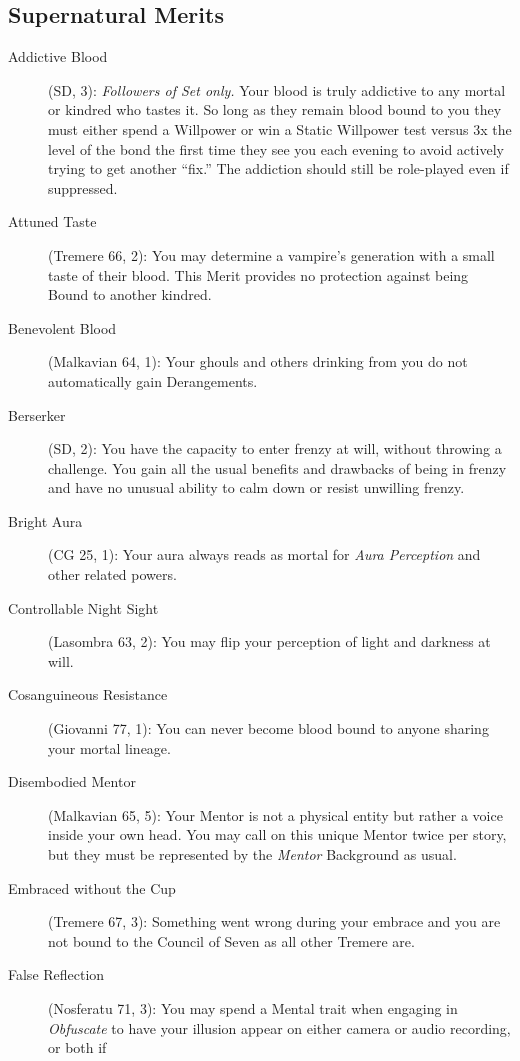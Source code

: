 \subsection{Supernatural Merits}
\begin{description}
	\item[Addictive Blood] (SD, 3):  \emph{Followers of Set only.}  Your blood is truly 
	addictive to any mortal or kindred who tastes it.  So long as they remain blood bound to you 
	they must either spend a Willpower or win a Static Willpower test versus 3x the level of the bond 
	the first time they see you each evening to avoid actively trying to get another ``fix.''  The 
	addiction should still be role-played even if suppressed.
	\item[Attuned Taste] (Tremere 66, 2):  You may determine a vampire's generation with a small 
	taste of their blood.  This Merit provides no protection against being Bound to another kindred.
	\item[Benevolent Blood] (Malkavian 64, 1):  Your ghouls and others drinking from you do not 
	automatically gain Derangements.
	\item[Berserker] (SD, 2):  You have the capacity to enter frenzy at will, without throwing a 
	challenge.  You gain all the usual benefits and drawbacks of being in frenzy and have no 
	unusual ability to calm down or resist unwilling frenzy.
	\item[Bright Aura] (CG 25, 1):  Your aura always reads as mortal for \emph{Aura Perception} and other 
	related powers.
	\item[Controllable Night Sight] (Lasombra 63, 2):  You may flip your perception of light and 
	darkness at will.
	\item[Cosanguineous Resistance] (Giovanni 77, 1):  You can never become blood bound to anyone 
	sharing your mortal lineage.
	\item[Disembodied Mentor] (Malkavian 65, 5):  Your Mentor is not a physical entity but rather 
	a voice inside your own head.  You may call on this unique Mentor twice per story, but they must 
	be represented by the \emph{Mentor} Background as usual.
	\item[Embraced without the Cup] (Tremere 67, 3):  Something went wrong during your embrace and 
	you are not bound to the Council of Seven as all other Tremere are.
	\item[False Reflection] (Nosferatu 71, 3):  You may spend a Mental trait when engaging in 
	\emph{Obfuscate} to have your illusion appear on either camera or audio recording, or both if 

\end{description}
